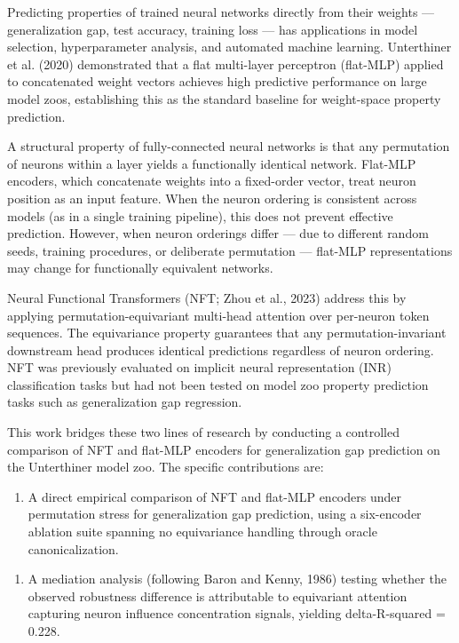 
Predicting properties of trained neural networks directly from their weights --- generalization gap, test accuracy, training loss --- has applications in model selection, hyperparameter analysis, and automated machine learning. Unterthiner et al. (2020) demonstrated that a flat multi-layer perceptron (flat-MLP) applied to concatenated weight vectors achieves high predictive performance on large model zoos, establishing this as the standard baseline for weight-space property prediction.

A structural property of fully-connected neural networks is that any permutation of neurons within a layer yields a functionally identical network. Flat-MLP encoders, which concatenate weights into a fixed-order vector, treat neuron position as an input feature. When the neuron ordering is consistent across models (as in a single training pipeline), this does not prevent effective prediction. However, when neuron orderings differ --- due to different random seeds, training procedures, or deliberate permutation --- flat-MLP representations may change for functionally equivalent networks.

Neural Functional Transformers (NFT; Zhou et al., 2023) address this by applying permutation-equivariant multi-head attention over per-neuron token sequences. The equivariance property guarantees that any permutation-invariant downstream head produces identical predictions regardless of neuron ordering. NFT was previously evaluated on implicit neural representation (INR) classification tasks but had not been tested on model zoo property prediction tasks such as generalization gap regression.

This work bridges these two lines of research by conducting a controlled comparison of NFT and flat-MLP encoders for generalization gap prediction on the Unterthiner model zoo. The specific contributions are:

\begin{enumerate}
\item A direct empirical comparison of NFT and flat-MLP encoders under permutation stress for generalization gap prediction, using a six-encoder ablation suite spanning no equivariance handling through oracle canonicalization.
\end{enumerate}

\begin{enumerate}
\item A mediation analysis (following Baron and Kenny, 1986) testing whether the observed robustness difference is attributable to equivariant attention capturing neuron influence concentration signals, yielding delta-R-squared = 0.228.
\end{enumerate}

